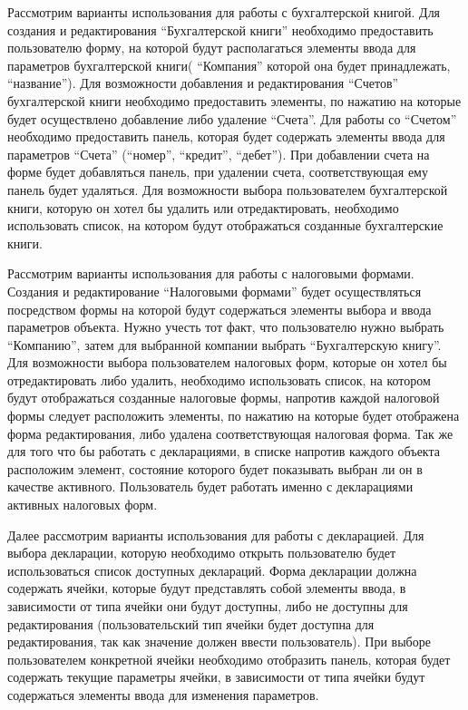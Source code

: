 \documentclass[14pt,a4paper]{reportmod}
\begin{document}
Рассмотрим варианты использования для работы с бухгалтерской книгой. Для создания и редактирования ``Бухгалтерской книги'' необходимо предоставить пользователю форму, на которой будут располагаться элементы ввода для параметров бухгалтерской книги( ``Компания'' которой она будет принадлежать, ``название''). Для возможности добавления и редактирования ``Счетов'' бухгалтерской книги необходимо предоставить элементы, по нажатию на которые будет осуществлено добавление либо удаление ``Счета''. Для работы со ``Счетом'' необходимо предоставить панель, которая будет содержать элементы ввода для параметров ``Счета'' (``номер'', ``кредит'', ``дебет''). При добавлении счета на форме будет добавляться панель, при удалении счета, соответствующая ему панель будет удаляться.
Для возможности выбора пользователем бухгалтерской книги, которую он хотел бы удалить или отредактировать, необходимо использовать список, на котором будут отображаться созданные бухгалтерские книги.

Рассмотрим варианты использования для работы с налоговыми формами. Создания и редактирование ``Налоговыми формами'' будет осуществляться посредством формы на которой будут содержаться элементы выбора и ввода параметров объекта. Нужно учесть тот факт, что пользователю нужно выбрать ``Компанию'', затем для выбранной компании выбрать ``Бухгалтерскую книгу''.
Для возможности выбора пользователем налоговых форм, которые он хотел бы отредактировать либо удалить, необходимо использовать список, на котором будут отображаться созданные налоговые формы, напротив каждой налоговой формы следует расположить элементы, по нажатию на которые будет отображена форма редактирования, либо удалена соответствующая налоговая форма. Так же для того что бы работать с декларациями, в списке напротив каждого объекта расположим элемент, состояние которого будет показывать выбран ли он в качестве активного. Пользователь будет работать именно с декларациями активных налоговых форм.

Далее рассмотрим варианты использования для работы с декларацией. Для выбора декларации, которую необходимо открыть пользователю будет использоваться список доступных деклараций. Форма декларации должна содержать ячейки, которые будут представлять собой элементы ввода, в зависимости от типа ячейки они будут доступны, либо не доступны для редактирования (пользовательский тип ячейки будет доступна для редактирования, так как значение должен ввести пользователь). При выборе пользователем конкретной ячейки необходимо отобразить панель, которая будет содержать текущие параметры ячейки, в зависимости от типа ячейки будут содержаться элементы ввода для изменения параметров.
\end{document}
